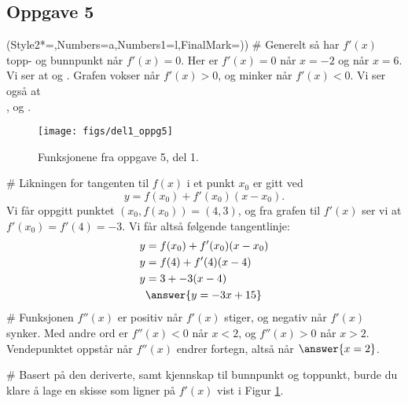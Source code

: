 \subsection*{Oppgave 5}
\begin{easylist}[enumerate]
\ListProperties(Style2*=,Numbers=a,Numbers1=l,FinalMark={)})
# Generelt så har $f'(x)$ topp- og bunnpunkt når $f'(x) = 0$.
Her er $f'(x) = 0$ når $x = -2$ og når $x = 6$. 
Vi ser at  og . Grafen vokser når $f'(x) > 0$, og minker når $f'(x) < 0$. Vi ser også at \\ , og .

\begin{figure}[ht!]
	\centering
	\texttt{[image: figs/del1\_oppg5]}
	\caption{Funksjonene fra oppgave 5, del 1.}
	\label{fig:del1_oppg5}
\end{figure}

# Likningen for tangenten til $f(x)$ i et punkt $x_0$ er gitt ved
\begin{equation*}
	y = f(x_0) + f'(x_0) ( x - x_0).
\end{equation*}
Vi får oppgitt punktet $(x_0, f(x_0)) = (4, 3)$, og fra grafen til $f'(x)$
ser vi at $f'(x_0) = f'(4) = -3$. Vi får altså følgende tangentlinje:
\begin{align*}
	y &= f(x_0) + f'(x_0) ( x - x_0) \\
	y &= f(4) + f'(4) ( x - 4) \\
	y &= 3 + -3 ( x - 4) \\
	& \answer{y = -3x + 15 }
\end{align*}
# Funksjonen $f''(x)$ er positiv når $f'(x)$ stiger, og negativ når $f'(x)$ synker.
Med andre ord er $f''(x) < 0$ når $x < 2$, og $f''(x) > 0$ når $x > 2$.
Vendepunktet oppstår når $f''(x)$ endrer fortegn, altså når $\answer{x=2}$.

# Basert på den deriverte, samt kjennskap til bunnpunkt og toppunkt, burde du klare å lage en skisse som ligner på $f'(x)$ vist i Figur \ref{fig:del1_oppg5}.
\end{easylist}

